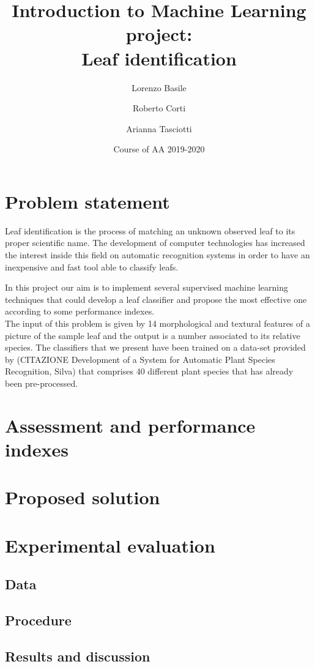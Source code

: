 \documentclass{article}
\title{Introduction to Machine Learning project:\\ Leaf identification}
\author[1]{Lorenzo Basile}
\author[2]{Roberto Corti}
\author[3]{Arianna Tasciotti}
\affil[1,2,3]{
    problem statement,
    solution design,
    solution development,
    writing
}
\date{Course of AA 2019-2020}
\begin{document}
\maketitle



\section{Problem statement}
Leaf identification is the process of matching an unknown observed leaf to its proper scientific name. The development of computer technologies has increased the interest inside this field on automatic recognition systems in order to have an inexpensive and fast tool able to classify leafs.  

In this project our aim is to implement several supervised machine learning techniques that could develop a leaf classifier and propose the most effective one according to some performance indexes. \\
The input of this problem is given by 14 morphological and textural features of a picture of the sample leaf and the output is a number associated to its relative species. The classifiers that we present have been trained on a data-set provided by (CITAZIONE Development of a System for Automatic Plant Species Recognition, Silva) that comprises 40 different plant species that has already been pre-processed.


\section{Assessment and 
 performance indexes}



\section{Proposed solution}



\section{Experimental evaluation}

\subsection{Data}

\subsection{Procedure}

\subsection{Results and discussion}



\newpage


\end{document}
